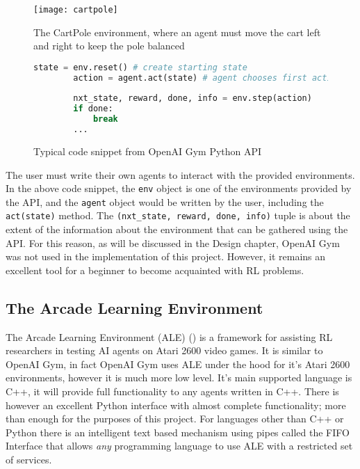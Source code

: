 \begin{figure}[H]
    \centering
    \texttt{[image: cartpole]}
    \caption{The CartPole environment, where an agent must move the cart left and right to keep the pole balanced}
\end{figure}

\begin{figure}[h]
    \centering
    \begin{lstlisting}[language=Python]
        state = env.reset() # create starting state
        action = agent.act(state) # agent chooses first action
        
        nxt_state, reward, done, info = env.step(action)
        if done:
            break
        ...
    \end{lstlisting}
    \caption{Typical code snippet from OpenAI Gym Python API}
\end{figure}

The user must write their own agents to interact with the provided environments. In the above code snippet, the \texttt{env} object is one of the environments provided by the API, and the \texttt{agent} object would be written by the user, including the \texttt{act(state)} method. The \texttt{(nxt\_state, reward, done, info)} tuple is about the extent of the information about the environment that can be gathered using the API. For this reason, as will be discussed in the Design chapter, OpenAI Gym was not used in the implementation of this project. However, it remains an excellent tool for a beginner to become acquainted with RL problems.

\subsection{The Arcade Learning Environment}
The Arcade Learning Environment (ALE) (\cite{ale-eval-plat}) is a framework for assisting RL researchers in testing AI agents on Atari 2600 video games. It is similar to OpenAI Gym, in fact OpenAI Gym uses ALE under the hood for it's Atari 2600 environments, however it is much more low level. It's main supported language is C++, it will provide full functionality to any agents written in C++. There is however an excellent Python interface with almost complete functionality; more than enough for the purposes of this project. For languages other than C++ or Python there is an intelligent text based mechanism using pipes called the FIFO Interface that allows \textit{any} programming language to use ALE with a restricted set of services. \paragraph{}

